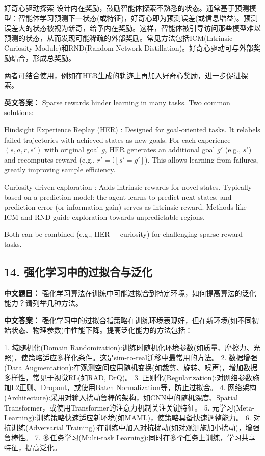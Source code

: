\documentclass[10pt,a4paper]{ctexart}
\begin{document}
 好奇心驱动探索  设计内在奖励，鼓励智能体探索不熟悉的状态。通常基于预测模型：智能体学习预测下一状态(或特征)，好奇心即为预测误差(或信息增益)。预测误差大的状态被视为新奇，给予内在奖励。这样，智能体被引导访问那些模型难以预测的状态，从而发现可能稀疏的外部奖励。常见方法包括ICM(Intrinsic Curiosity Module)和RND(Random Network Distillation)。好奇心驱动可与外部奖励结合，形成总奖励。

两者可结合使用，例如在HER生成的轨迹上再加入好奇心奖励，进一步促进探索。

\textbf{英文答案：}  
Sparse rewards hinder learning in many tasks. Two common solutions:

 Hindsight Experience Replay (HER) : Designed for goal-oriented tasks. It relabels failed trajectories with achieved states as new goals. For each experience \((s,a,r,s')\) with original goal \(g\), HER generates an additional goal \(g'\) (e.g., \(s'\)) and recomputes reward (e.g., \(r' = \mathbb{I}[s' = g']\)). This allows learning from failures, greatly improving sample efficiency.

 Curiosity-driven exploration : Adds intrinsic rewards for novel states. Typically based on a prediction model: the agent learns to predict next states, and prediction error (or information gain) serves as intrinsic reward. Methods like ICM and RND guide exploration towards unpredictable regions.

Both can be combined (e.g., HER + curiosity) for challenging sparse reward tasks.

\subsection*{14. 强化学习中的过拟合与泛化}
\textbf{中文题目：} 强化学习算法在训练中可能过拟合到特定环境，如何提高算法的泛化能力？请列举几种方法。

\textbf{中文答案：}  
强化学习中的过拟合指策略在训练环境表现好，但在新环境(如不同初始状态、物理参数)中性能下降。提高泛化能力的方法包括：

1.  域随机化(Domain Randomization):训练时随机化环境参数(如质量、摩擦力、光照)，使策略适应多样化条件。这是sim-to-real迁移中最常用的方法。
2.  数据增强(Data Augmentation):在观测空间应用随机变换(如裁剪、旋转、噪声)，增加数据多样性，常见于视觉RL(如RAD, DrQ)。
3.  正则化(Regularization):对网络参数施加L2正则、Dropout，或使用Batch Normalization等，防止过拟合。
4.  网络架构(Architecture):采用对输入扰动鲁棒的架构，如CNN中的随机深度、Spatial Transformer，或使用Transformer的注意力机制关注关键特征。
5.  元学习(Meta-Learning):训练策略快速适应新环境(如MAML)，使策略具备快速调整能力。
6.  对抗训练(Adversarial Training):在训练中加入对抗扰动(如对观测施加小扰动)，增强鲁棒性。
7.  多任务学习(Multi-task Learning):同时在多个任务上训练，学习共享特征，提高泛化。
\end{document}
